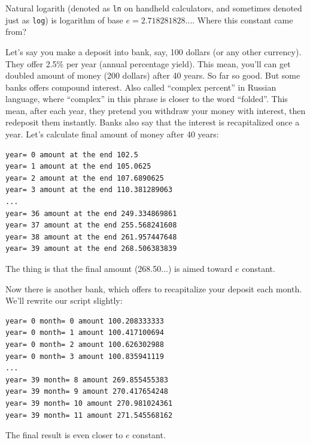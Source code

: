 
Natural logarith (denoted as \texttt{ln} on handheld calculators, and sometimes denoted just as \texttt{log})
is logarithm of base $e=2.718281828...$.
Where this constant came from?

\leveldown{}


Let's say you make a deposit into bank, say, 100 dollars (or any other currency).
They offer 2.5\% per year (annual percentage yield).
This mean, you'll can get doubled amount of money (200 dollars) after 40 years.
So far so good.
But some banks offers compound interest.
Also called ``complex percent'' in Russian language, where ``complex'' in this phrase is closer to the word ``folded''.
This mean, after each year, they pretend you withdraw your money with interest, then redeposit them instantly.
Banks also say that the interest is recapitalized once a year.
Let's calculate final amount of money after 40 years:



\begin{lstlisting}
year= 0 amount at the end 102.5
year= 1 amount at the end 105.0625
year= 2 amount at the end 107.6890625
year= 3 amount at the end 110.381289063
...
year= 36 amount at the end 249.334869861
year= 37 amount at the end 255.568241608
year= 38 amount at the end 261.957447648
year= 39 amount at the end 268.506383839
\end{lstlisting}

The thing is that the final amount (268.50...) is aimed toward $e$ constant.

Now there is another bank, which offers to recapitalize your deposit each month.
We'll rewrite our script slightly:



\begin{lstlisting}
year= 0 month= 0 amount 100.208333333
year= 0 month= 1 amount 100.417100694
year= 0 month= 2 amount 100.626302988
year= 0 month= 3 amount 100.835941119
...
year= 39 month= 8 amount 269.855455383
year= 39 month= 9 amount 270.417654248
year= 39 month= 10 amount 270.981024361
year= 39 month= 11 amount 271.545568162
\end{lstlisting}

The final result is even closer to $e$ constant.

